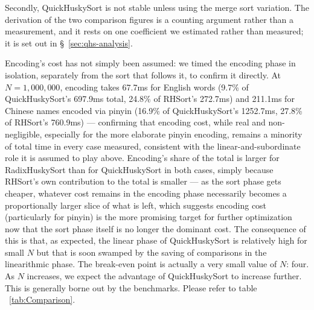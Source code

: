 \documentclass[twoside,leqno,twocolumn]{article}
\begin{document}
Secondly, QuickHuskySort is not stable unless using the merge sort variation.
The derivation of the two comparison figures is a counting argument rather than a measurement, and it
rests on one coefficient we estimated rather than measured; it is set out in \S~\ref{sec:qhs-analysis}.

Encoding's cost has not simply been assumed:
we timed the encoding phase in isolation,
separately from the sort that follows it, to confirm it directly.
At $N = 1{,}000{,}000$, encoding takes 67.7ms for English words (9.7\% of QuickHuskySort's 697.9ms total,
24.8\% of RHSort's 272.7ms) and 211.1ms for Chinese names encoded via pinyin (16.9\% of QuickHuskySort's
1252.7ms, 27.8\% of RHSort's 760.9ms) — confirming that encoding cost, while real and non-negligible,
especially for the more elaborate pinyin encoding, remains a minority of total time in every case measured,
consistent with the linear-and-subordinate role it is assumed to play above.
Encoding's share of the total is larger for RadixHuskySort than for QuickHuskySort in both cases,
simply because RHSort's own contribution to the total is smaller —
as the sort phase gets cheaper,
whatever cost remains in the encoding phase necessarily becomes a proportionally larger slice of what is left,
which suggests encoding cost (particularly for pinyin)
is the more promising target for further optimization now that the sort phase itself is no longer the dominant cost.
The consequence of this is that, as expected,
the linear phase of QuickHuskySort is relatively high for small $N$ but that is soon swamped by the saving of comparisons in the linearithmic phase.
The break-even point is actually a very small value of $N$:
four.
As $N$ increases, we expect the advantage of QuickHuskySort to increase further.
This is generally borne out by the benchmarks.
Please refer to table ~\ref{tab:Comparison}.
\end{document}
